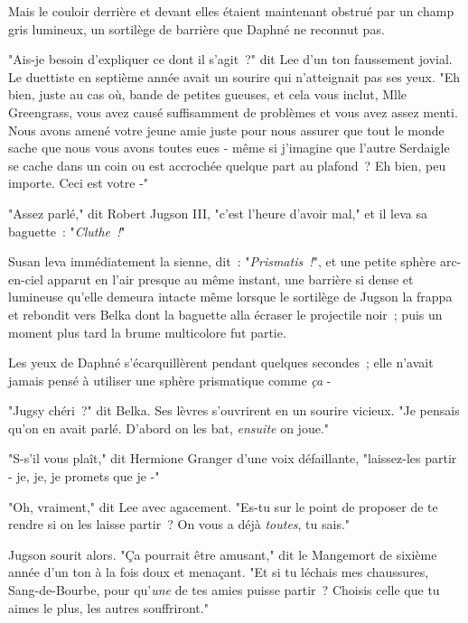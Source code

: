 Mais le couloir derrière et devant elles étaient maintenant obstrué par un champ gris lumineux, un sortilège de barrière que Daphné ne reconnut pas.

"Ais-je besoin d'expliquer ce dont il s'agit~?" dit Lee d'un ton faussement jovial. Le duettiste en septième année avait un sourire qui n'atteignait pas ses yeux. "Eh bien, juste au cas où, bande de petites gueuses, et cela vous inclut, Mlle Greengrass, vous avez causé suffisamment de problèmes et vous avez assez menti. Nous avons amené votre jeune amie juste pour nous assurer que tout le monde sache que nous vous avons toutes eues - même si j'imagine que l'autre Serdaigle se cache dans un coin ou est accrochée quelque part au plafond~? Eh bien, peu importe. Ceci est votre -"

"Assez parlé," dit Robert Jugson III, "c'est l'heure d'avoir mal," et il leva sa baguette~: "\emph{Cluthe~!}"

Susan leva immédiatement la sienne, dit~: "\emph{Prismatis~!}", et une petite sphère arc-en-ciel apparut en l'air presque au même instant, une barrière si dense et lumineuse qu'elle demeura intacte même lorsque le sortilège de Jugson la frappa et rebondit vers Belka dont la baguette alla écraser le projectile noir~; puis un moment plus tard la brume multicolore fut partie.

Les yeux de Daphné s'écarquillèrent pendant quelques secondes~; elle n'avait jamais pensé à utiliser une sphère prismatique comme \emph{ça} -

"Jugsy chéri~?" dit Belka. Ses lèvres s'ouvrirent en un sourire vicieux. "Je pensais qu'on en avait parlé. D'abord on les bat, \emph{ensuite} on joue."

"S-s'il vous plaît," dit Hermione Granger d'une voix défaillante, "laissez-les partir - je, je, je promets que je -"

"Oh, vraiment," dit Lee avec agacement. "Es-tu sur le point de proposer de te rendre si on les laisse partir~? On vous a déjà \emph{toutes}, tu sais."

Jugson sourit alors. "Ça pourrait être amusant," dit le Mangemort de sixième année d'un ton à la fois doux et menaçant. "Et si tu léchais mes chaussures, Sang-de-Bourbe, pour qu'\emph{une} de tes amies puisse partir~? Choisis celle que tu aimes le plus, les autres souffriront."

